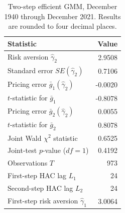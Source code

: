 \begin{table}[!htbp]
  \centering
  \caption{Two-step efficient GMM, December 1940 through December 2021.
  Results are rounded to four decimal places.}
  \label{tab:q3d-gmm-summary}
  \small
  \begin{tabular}{lr}
    \toprule
    Statistic & Value \\
    \midrule
    Risk aversion $\hat\gamma_2$ & 2.9508 \\
    Standard error $SE(\hat\gamma_2)$ & 0.7106 \\
    Pricing error $\bar g_1(\hat\gamma_2)$ & -0.0020 \\
    $t$-statistic for $\bar g_1$ & -0.8078 \\
    Pricing error $\bar g_2(\hat\gamma_2)$ & 0.0055 \\
    $t$-statistic for $\bar g_2$ & 0.8078 \\
    Joint Wald $\chi^2$ statistic & 0.6525 \\
    Joint-test $p$-value ($df=1$) & 0.4192 \\
    Observations $T$ & 973 \\
    First-step HAC lag $L_1$ & 24 \\
    Second-step HAC lag $L_2$ & 24 \\
    First-step risk aversion $\hat\gamma_1$ & 3.0064 \\
    \bottomrule
  \end{tabular}
\end{table}
